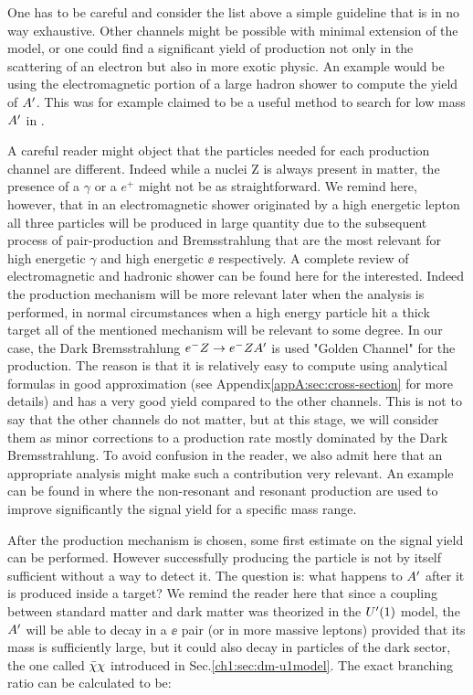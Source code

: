 One has to be careful and consider the list above a simple guideline that is in no way exhaustive. Other channels might be possible with minimal extension of the model, or one could find a significant yield of production not only in the scattering of an electron but also in more exotic physic. An example would be using the electromagnetic portion of a large hadron shower to compute the yield of $A'$. This was for example claimed to be a useful method to search for low mass $A'$ in \cite{Celentano:2020vtu}.

A careful reader might object that the particles needed for each production channel are different. Indeed while a nuclei Z is always present in matter, the presence of a $\gamma$ or a $e^+$ might not be as straightforward. We remind here, however, that in an electromagnetic shower originated by a high energetic lepton all three particles will be produced in large quantity due to the subsequent process of pair-production and Bremsstrahlung that are the most relevant for high energetic $\gamma$ and high energetic $\ee$ respectively. A complete review of electromagnetic and hadronic shower can be found here \cite{Bichsel:2002cf} for the interested. Indeed the production mechanism will be more relevant later when the analysis is performed, in normal circumstances when a high energy particle hit a thick target all of the mentioned mechanism will be relevant to some degree. In our case, the Dark Bremsstrahlung $e^- Z \to e^- Z A'$ is used "Golden Channel" for the production. The reason is that it is relatively easy to compute using analytical formulas in good approximation (see Appendix\ref{appA:sec:cross-section} for more details) and has a very good yield compared to the other channels. This is not to say that the other channels do not matter, but at this stage, we will consider them as minor corrections to a production rate mostly dominated by the Dark Bremsstrahlung. To avoid confusion in the reader, we also admit here that an appropriate analysis might make such a contribution very relevant. An example can be found in \cite{Marsicano_2018} where the non-resonant and resonant production are used to improve significantly the signal yield for a specific mass range.

After the production mechanism is chosen, some first estimate on the signal yield can be performed. However successfully producing the particle is not by itself sufficient without a way to detect it. The question is: what happens to $A'$ after it is produced inside a target? We remind the reader here that since a coupling between standard matter and dark matter was theorized in the $U'(1)$ model, the $A'$ will be able to decay in a $\ee$ pair (or in more massive leptons) provided that its mass is sufficiently large, but it could also decay in particles of the dark sector, the one called $\bar{\chi} \chi$ introduced in Sec.\ref{ch1:sec:dm-u1model}. The exact branching ratio can be calculated to be:

